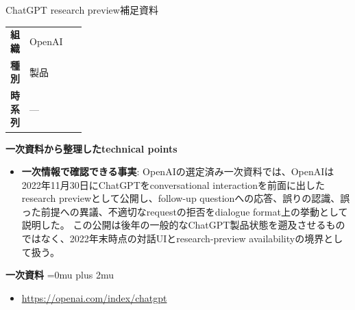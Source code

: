 \begin{technicalnote}{ChatGPT research preview}{補足資料}
\begingroup
\begin{tabularx}{\linewidth}{@{}>{\bfseries}p{0.22\linewidth}X@{}}
組織 & OpenAI \\
種別 & 製品 \\
時系列 & — \\
\end{tabularx}
\smallskip
{\bfseries 一次資料から整理したtechnical points}
\begin{itemize}[leftmargin=1.5em,itemsep=0.35em]
\item \textbf{一次情報で確認できる事実}: OpenAIの選定済み一次資料では、OpenAIは2022年11月30日にChatGPTをconversational interactionを前面に出したresearch previewとして公開し、follow-up questionへの応答、誤りの認識、誤った前提への異議、不適切なrequestの拒否をdialogue format上の挙動として説明した。 この公開は後年の一般的なChatGPT製品状態を遡及させるものではなく、2022年末時点の対話UIとresearch-preview availabilityの境界として扱う。
\end{itemize}
\begin{minipage}{\linewidth}
\begin{samepage}
{\bfseries 一次資料}
\begingroup\sloppy
\Urlmuskip=0mu plus 2mu\relax
\begin{itemize}[leftmargin=1.5em,itemsep=0.25em]
\item {\scriptsize\url{https://openai.com/index/chatgpt}}
\end{itemize}
\endgroup
\end{samepage}
\end{minipage}
\endgroup
\end{technicalnote}
\medskip

